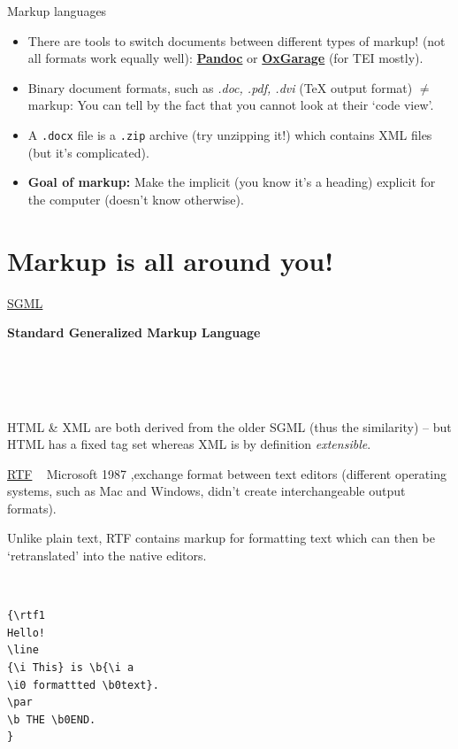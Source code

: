 \begin{frame}[allowframebreaks]{Markup languages}
\begin{itemize}\footnotesize
\item There are tools to switch documents between different types of markup! (not all formats work equally well): \textbf{\href{https://pandoc.org/}{Pandoc}} or \textbf{\href{http://oxgarage.tei-c.org}{OxGarage}} (for TEI mostly). 
\item Binary document formats, such as  \emph{.doc, .pdf, .dvi} (\TeX{} output format) $\neq$ markup: You can tell by the fact that you cannot look at their `code view'. 
\item A \texttt{.docx} file is a \texttt{.zip} archive (try unzipping it!) which contains XML files (but it's complicated).
\item \textbf{Goal of markup:} Make the implicit (you know it's a heading) explicit for the computer (doesn't know otherwise).
\end{itemize}
\end{frame}




\section{Markup is all around you!}
\begin{frame}{\href{https://en.wikipedia.org/wiki/Standard_Generalized_Markup_Language}{SGML}}

\textbf{Standard Generalized Markup Language}

\\

\\
\\


HTML \& XML are both derived from the older SGML (thus the similarity) -- but HTML has a fixed tag set whereas XML is by definition \emph{extensible}.

\end{frame}


\begin{frame}[fragile]{\href{https://en.wikipedia.org/wiki/Rich_Text_Format}{RTF}}
\small 
{}~
Microsoft 1987 \sep exchange format between text editors (different operating systems, such as Mac and Windows, didn't create interchangeable  output formats).

Unlike plain text, RTF contains markup for formatting text which can then be `retranslated' into the native editors.

\\
\footnotesize
\begin{verbatim}
{\rtf1
Hello!
\line
{\i This} is \b{\i a
\i0 formattted \b0text}.
\par
\b THE \b0END.
} 
\end{verbatim}\normalsize

\end{frame}

